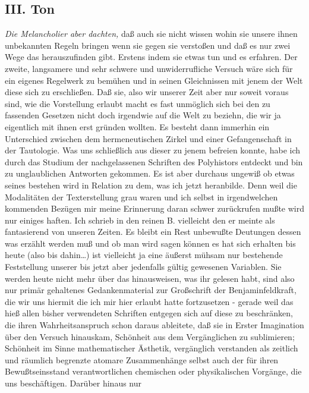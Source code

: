 \documentclass[
]{article}
\author{}
\date{\vspace{-2.5em}}
\begin{document}
\subsection{III. Ton}\label{iii.-ton}

\emph{Die Melancholier aber dachten,} daß auch sie nicht wissen wohin
sie unsere ihnen unbekannten Regeln bringen wenn sie gegen sie verstoßen
und daß es nur zwei Wege das herauszufinden gibt. Erstens indem sie
etwas tun und es erfahren. Der zweite, langsamere und sehr schwere und
unwiderrufliche Versuch wäre sich für ein eigenes Regelwerk zu bemühen
und in seinen Gleichnissen mit jenem der Welt diese sich zu erschließen.
Daß sie, also wir unserer Zeit aber nur soweit voraus sind, wie die
Vorstellung erlaubt macht es fast unmöglich sich bei den zu fassenden
Gesetzen nicht doch irgendwie auf die Welt zu beziehn, die wir ja
eigentlich mit ihnen erst gründen wollten. Es besteht dann immerhin ein
Unterschied zwischen dem hermeneutischen Zirkel und einer Gefangenschaft
in der Tautologie. Was uns schließlich aus dieser zu jenem befreien
konnte, habe ich durch das Studium der nachgelassenen Schriften des
Polyhistors entdeckt und bin zu unglaublichen Antworten gekommen. Es ist
aber durchaus ungewiß ob etwas seines bestehen wird in Relation zu dem,
was ich jetzt heranbilde. Denn weil die Modalitäten der Texterstellung
grau waren und ich selbst in irgendwelchen kommenden Bezügen mir meine
Erinnerung daran schwer zurückrufen mußte wird nur einiges haften. Ich
schrieb in den reinen B. vielleicht den er meinte als fantasierend von
unseren Zeiten. Es bleibt ein Rest unbewußte Deutungen dessen was
erzählt werden muß und ob man wird sagen können es hat sich erhalten bis
heute (also bis dahin\ldots) ist vielleicht ja eine äußerst mühsam nur
bestehende Feststellung unserer bis jetzt aber jedenfalls gültig
gewesenen Variablen. Sie werden heute nicht mehr über das hinausweisen,
was ihr gelesen habt, sind also nur primär gehaltenes Gedankenmaterial
zur Großschrift der Benjaminfeldkraft, die wir uns hiermit die ich mir
hier erlaubt hatte fortzusetzen - gerade weil das hieß allen bisher
verwendeten Schriften entgegen sich auf diese zu beschränken, die ihren
Wahrheitsanspruch schon daraus ableitete, daß sie in Erster Imagination
über den Versuch hinauskam, Schönheit aus dem Vergänglichen zu
sublimieren; Schönheit im Sinne mathematischer Ästhetik, vergänglich
verstanden als zeitlich und räumlich begrenzte atomare Zusammenhänge
selbst auch der für ihren Bewußtseinsstand verantwortlichen chemischen
oder physikalischen Vorgänge, die uns beschäftigen. Darüber hinaus nur
\end{document}
